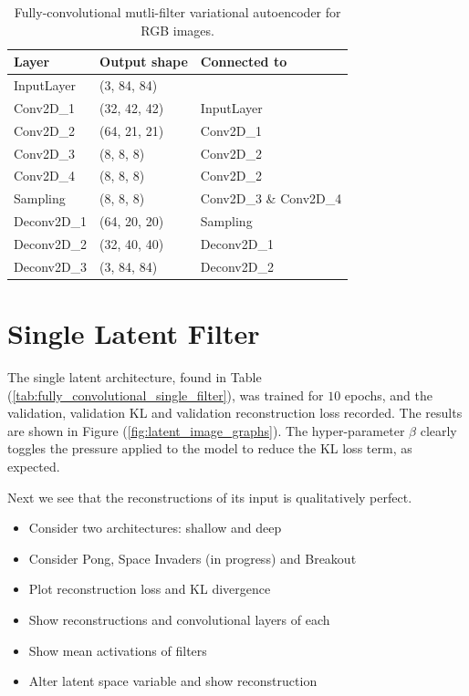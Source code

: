\begin{table}[]
\centering
\begin{tabular}{@{}lll@{}}
\toprule
\textbf{Layer} & \textbf{Output shape} & \textbf{Connected to}  \\ \midrule
InputLayer     & (3, 84, 84)           &                        \\
Conv2D\_1      & (32, 42, 42)          & InputLayer             \\
Conv2D\_2      & (64, 21, 21)          & Conv2D\_1              \\
Conv2D\_3      & (8, 8, 8)             & Conv2D\_2              \\
Conv2D\_4      & (8, 8, 8)             & Conv2D\_2              \\
Sampling       & (8, 8, 8)             & Conv2D\_3 \& Conv2D\_4 \\
Deconv2D\_1    & (64, 20, 20)          & Sampling               \\
Deconv2D\_2    & (32, 40, 40)          & Deconv2D\_1            \\
Deconv2D\_3    & (3, 84, 84)           & Deconv2D\_2           
\end{tabular}
\caption{Fully-convolutional mutli-filter variational autoencoder for RGB images.}
\label{tab:fully_convolutional_multiple_filter_rgb}
\end{table}


%
%
%
%
%
\section{Single Latent Filter}

The single latent architecture, found in Table (\ref{tab:fully_convolutional_single_filter}), was trained for $10$ epochs, and the validation, validation KL and validation reconstruction loss recorded. The results are shown in Figure (\ref{fig:latent_image_graphs}). The hyper-parameter $\beta$ clearly toggles the pressure applied to the model to reduce the KL loss term, as expected.

Next we see that the reconstructions of its input is qualitatively perfect. 

\begin{itemize}
\item Consider two architectures: shallow and deep
\item Consider Pong, Space Invaders (in progress) and Breakout
\item Plot reconstruction loss and KL divergence
\item Show reconstructions and convolutional layers of each
\item Show mean activations of filters
\item Alter latent space variable and show reconstruction
\end{itemize}


